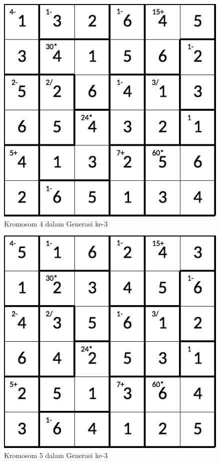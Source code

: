 \begin{figure}
\centering
\captionsetup{justification=centering}
\includegraphics[scale=0.333]{Gambar/hybridgenetic/Generation3Chromosome4}
\caption[Kromosom 4 dalam Generasi ke-3]{Kromosom 4 dalam Generasi ke-3}
\label{fig:analisisg3k4}
\end{figure}

\begin{figure}
\centering
\captionsetup{justification=centering}
\includegraphics[scale=0.333]{Gambar/hybridgenetic/Generation3Chromosome5}
\caption[Kromosom 5 dalam Generasi ke-3]{Kromosom 5 dalam Generasi ke-3}
\label{fig:analisisg3k5}
\end{figure}

